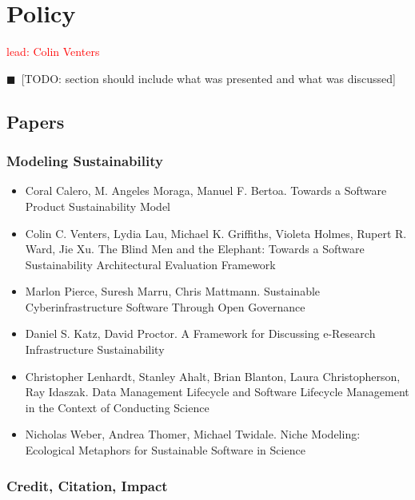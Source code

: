 \documentclass[11pt, oneside]{amsart}
\newcommand{\todo}[1]{{\color{blue}$\blacksquare$~\textsf{[TODO: #1]}}}
\newcommand{\note}[1]{ {\textcolor{red}    { #1 }}}
\begin{document}
\section{Policy} \label{sec:policy}

\note{lead: Colin Venters}

\todo{section should include what was presented and what was discussed}

\subsection{Papers}

\subsubsection*{Modeling Sustainability}

\begin{itemize}

\item Coral Calero, M. Angeles Moraga, Manuel F. Bertoa. Towards a
  Software Product Sustainability Model \cite{Calero_WSSSPE}

\item Colin C. Venters, Lydia Lau, Michael K. Griffiths, Violeta
  Holmes, Rupert R. Ward, Jie Xu. The Blind Men and the Elephant:
  Towards a Software Sustainability Architectural Evaluation Framework
  \cite{Venters_WSSSPE}

\item Marlon Pierce, Suresh Marru, Chris Mattmann. Sustainable
  Cyberinfrastructure Software Through Open Governance
  \cite{Pierce_WSSSPE}

\item Daniel S. Katz, David Proctor. A Framework for Discussing
  e-Research Infrastructure Sustainability \cite{Katz_WSSSPE}

\item Christopher Lenhardt, Stanley Ahalt, Brian Blanton, Laura
  Christopherson, Ray Idaszak. Data Management Lifecycle and Software
  Lifecycle Management in the Context of Conducting Science
  \cite{Lenhardt_WSSSPE}

\item Nicholas Weber, Andrea Thomer, Michael Twidale. Niche Modeling:
  Ecological Metaphors for Sustainable Software in Science
  \cite{Weber_WSSSPE}

\end{itemize}

\subsubsection*{Credit, Citation, Impact}
\end{document}
